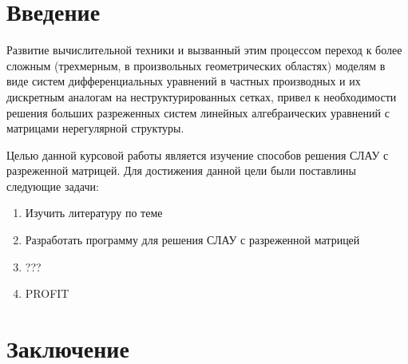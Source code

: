 \documentclass[a4paper, fontsize=14pt]{article}
\begin{document}
\tableofcontents

\thispagestyle{empty}
\newpage

\section*{Введение}

Развитие вычислительной техники и вызванный этим процессом переход к более сложным (трехмерным, 
в произвольных геометрических областях) моделям в виде систем дифференциальных уравнений в 
частных производных и их дискретным аналогам на неструктурированных сетках, привел к 
необходимости решения больших разреженных систем линейных алгебраических уравнений с 
матрицами нерегулярной структуры.

Целью данной курсовой работы является изучение способов решения СЛАУ с разреженной матрицей.
Для достижения данной цели были поставлины следующие задачи:
\begin{enumerate}
    \item Изучить литературу по теме
    \item Разработать программу для решения СЛАУ с разреженной матрицей
    \item ???
    \item PROFIT
\end{enumerate}


\newpage

\section*{Заключение}

\newpage


\end{document}
